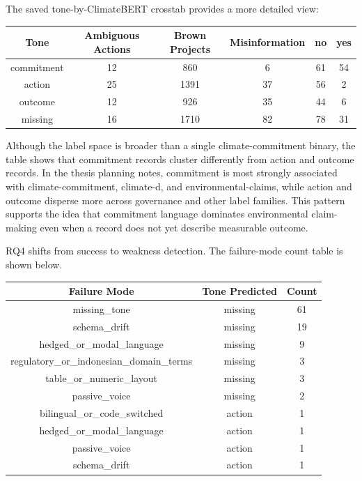 The saved tone-by-ClimateBERT crosstab provides a more detailed view:
\begin{table}[h!]
\centering
\begin{tabular}{|c|c|c|c|c|c|}
\hline
\textbf{Tone} & \textbf{Ambiguous Actions} & \textbf{Brown Projects} & \textbf{Misinformation} & \textbf{no} & \textbf{yes} \\ \hline
commitment & 12 & 860 & 6 & 61 & 54 \\ \hline
action & 25 & 1391 & 37 & 56 & 2 \\ \hline
outcome & 12 & 926 & 35 & 44 & 6 \\ \hline
missing & 16 & 1710 & 82 & 78 & 31 \\ \hline
\end{tabular}
\end{table}

Although the label space is broader than a single climate-commitment binary, the table shows that commitment records cluster differently from action and outcome records. In the thesis planning notes, commitment is most strongly associated with climate-commitment, climate-d, and environmental-claims, while action and outcome disperse more across governance and other label families. This pattern supports the idea that commitment language dominates environmental claim-making even when a record does not yet describe measurable outcome.

RQ4 shifts from success to weakness detection. The failure-mode count table is shown below.
\begin{table}[h!]
\centering
\begin{tabular}{|c|c|c|}
\hline
\textbf{Failure Mode} & \textbf{Tone Predicted} & \textbf{Count} \\ \hline
missing\_tone & missing & 61 \\ \hline
schema\_drift & missing & 19 \\ \hline
hedged\_or\_modal\_language & missing & 9 \\ \hline
regulatory\_or\_indonesian\_domain\_terms & missing & 3 \\ \hline
table\_or\_numeric\_layout & missing & 3 \\ \hline
passive\_voice & missing & 2 \\ \hline
bilingual\_or\_code\_switched & action & 1 \\ \hline
hedged\_or\_modal\_language & action & 1 \\ \hline
passive\_voice & action & 1 \\ \hline
schema\_drift & action & 1 \\ \hline
\end{tabular}
\end{table}

